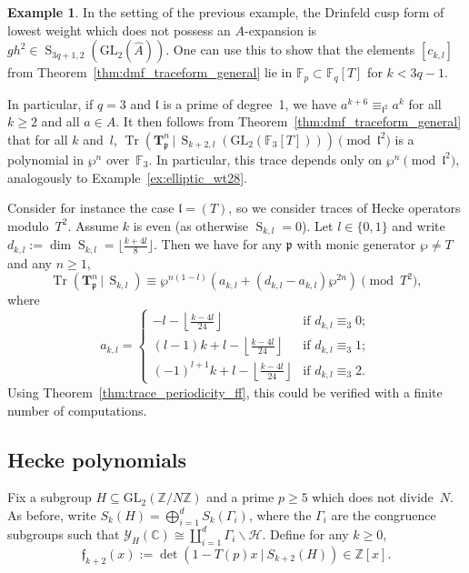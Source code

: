 \documentclass[10pt]{article}
\theoremstyle{definition}
\newtheorem{example}[theorem]{Example}
\DeclareMathOperator\Tr{Tr}
\renewcommand{\:}{\colon}
\newcommand{\T}{\mathbf{T}}
\renewcommand{\S}{\operatorname{S}}
\newcommand{\bF}{\mathbb{F}}
\renewcommand{\l}{\mathfrak{l}}
\begin{document}
\begin{example}
    In the setting of the previous example, the Drinfeld cusp form of lowest weight which does not possess an $A$-expansion is $gh^2 \in \S_{3q+1,2}(\mathrm{GL}_2(\hat{A}))$. One can use this to show that the elements $[c_{k,l}]$ from Theorem~\ref{thm:dmf_traceform_general} lie in $\bF_p \subset \bF_q[T]$ for $k < 3q-1$. 
    
    In particular, if $q=3$ and $\l$ is a prime of degree~1, we have $a^{k+6} \equiv_{\l^2} a^{k}$ for all $k \geq 2$ and all $a \in A$. It then follows from Theorem~\ref{thm:dmf_traceform_general} that for all $k$ and~$l$, $\Tr(\T_{\mathfrak p}^n \, | \, \S_{k+2,l}(\mathrm{GL}_2(\bF_3[T])))\pmod{\l^2}$ is a polynomial in $\wp^n$ over~$\bF_3$. In particular, this trace depends only on $\wp^n \pmod{\l^2}$, analogously to Example~\ref{ex:elliptic_wt28}.
    
    Consider for instance the case $\l = (T)$, so we consider traces of Hecke operators modulo~$T^2$. Assume $k$ is even (as otherwise $\S_{k,l} = 0$). Let $l \in \{0,1\}$ and write $d_{k,l} := \dim \S_{k,l} = \lfloor \frac{k+4l}{8} \rfloor$. Then we have for any $\mathfrak p$ with monic generator $\wp \neq T$ and any $n \geq 1$,
    \[
    \Tr(\T_{\mathfrak p}^n \, | \, \S_{k,l}) \equiv \wp^{n(1-l)} \left(a_{k,l} + (d_{k,l} - a_{k,l})\wp^{2n}\right) \pmod{T^2},
    \]
    where
    \[
    a_{k,l} = \begin{cases}
        -l -\left\lfloor \frac{k-4l}{24}\right\rfloor & \text{if } d_{k,l} \equiv_3 0;\\
        (l-1)k + l -\left\lfloor \frac{k-4l}{24}\right\rfloor & \text{if } d_{k,l} \equiv_3 1;\\
        (-1)^{l+1}k + l -\left\lfloor \frac{k-4l}{24}\right\rfloor & \text{if } d_{k,l} \equiv_3 2.
    \end{cases}
    \]
    Using Theorem~\ref{thm:trace_periodicity_ff}, this could be verified with a finite number of computations.
\end{example}

\subsection{Hecke polynomials}
Fix a subgroup $H \subseteq \mathrm{GL}_2(\mathbb Z/N\mathbb Z)$ and a prime $p \geq 5$ which does not divide~$N$. As before, write $S_k(H) = \bigoplus_{i=1}^d S_k(\Gamma_i)$, where the $\Gamma_i$ are the congruence subgroups such that $\mathcal Y_H(\mathbb C) \cong \coprod_{i=1}^d \Gamma_i \backslash \mathcal{H}$. Define for any $k \geq 0$,
\[
\mathfrak f_{k+2}(x) := \det(1-T(p)x \ | \ S_{k+2}(H)) \in \mathbb Z[x].
\]
\end{document}
